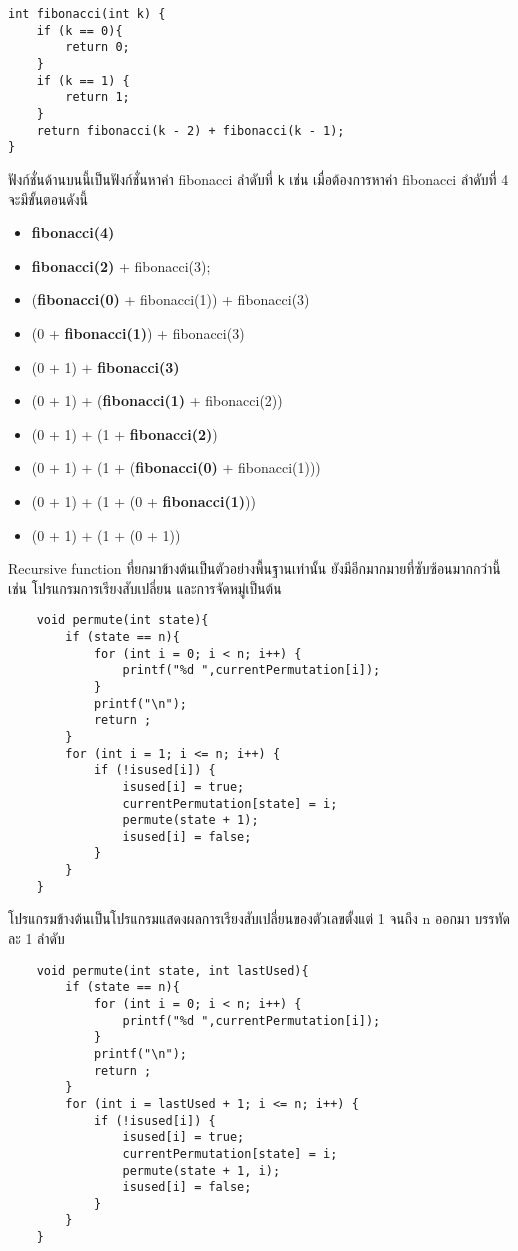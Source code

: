\begin{lstlisting}
int fibonacci(int k) {
	if (k == 0){
    	return 0;
    }
    if (k == 1) {
    	return 1;
    }
    return fibonacci(k - 2) + fibonacci(k - 1);
}
\end{lstlisting}
ฟังก์ชั่นด้านบนนี้เป็นฟังก์ชั่นหาค่า fibonacci ลำดับที่ \texttt{k} เช่น เมื่อต้องการหาค่า fibonacci ลำดับที่ 4 จะมีขั้นตอนดังนี้
\begin{itemize}
\item \textbf{fibonacci(4)}
\item \textbf{fibonacci(2)} + fibonacci(3);
\item (\textbf{fibonacci(0)} + fibonacci(1)) + fibonacci(3)
\item (0 + \textbf{fibonacci(1)}) + fibonacci(3)
\item (0 + 1) + \textbf{fibonacci(3)}
\item (0 + 1) + (\textbf{fibonacci(1)} + fibonacci(2))
\item (0 + 1) + (1 + \textbf{fibonacci(2)})
\item (0 + 1) + (1 + (\textbf{fibonacci(0)} + fibonacci(1)))
\item (0 + 1) + (1 + (0 + \textbf{fibonacci(1)}))
\item (0 + 1) + (1 + (0 + 1))
\end{itemize}

	Recursive function ที่ยกมาข้างต้นเป็นตัวอย่างพื้นฐานเท่านั้น ยังมีอีกมากมายที่ซับซ้อนมากกว่านี้ เช่น โปรแกรมการเรียงสับเปลี่ยน และการจัดหมู่เป็นต้น
    \begin{lstlisting}
    void permute(int state){
    	if (state == n){
        	for (int i = 0; i < n; i++) {
            	printf("%d ",currentPermutation[i]);
            }
            printf("\n");
        	return ;
        }
        for (int i = 1; i <= n; i++) {
        	if (!isused[i]) {
            	isused[i] = true;
                currentPermutation[state] = i;
                permute(state + 1);
                isused[i] = false;
            }
        }
    }
    \end{lstlisting}
    โปรแกรมข้างต้นเป็นโปรแกรมแสดงผลการเรียงสับเปลี่ยนของตัวเลขตั้งแต่ 1 จนถึง n ออกมา บรรทัดละ 1 ลำดับ
    
    \begin{lstlisting}
    void permute(int state, int lastUsed){
    	if (state == n){
        	for (int i = 0; i < n; i++) {
            	printf("%d ",currentPermutation[i]);
            }
            printf("\n");
        	return ;
        }
        for (int i = lastUsed + 1; i <= n; i++) {
        	if (!isused[i]) {
            	isused[i] = true;
                currentPermutation[state] = i;
                permute(state + 1, i);
                isused[i] = false;
            }
        }
    }
    \end{lstlisting}